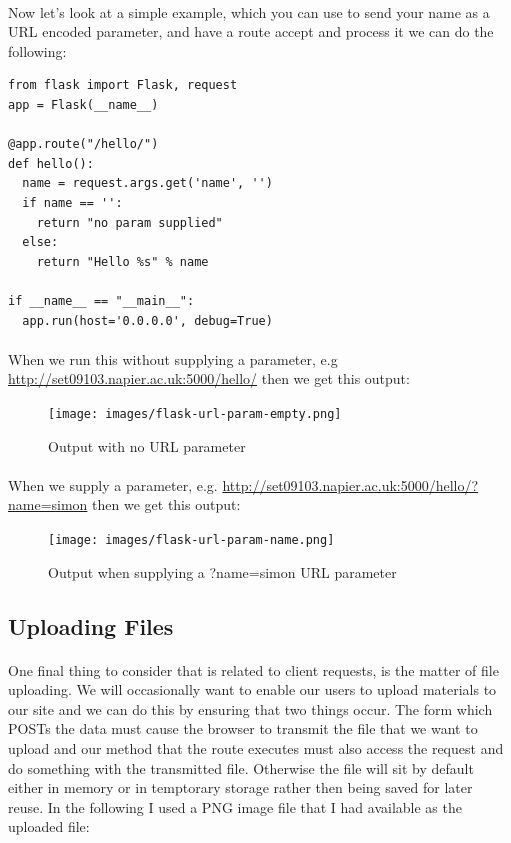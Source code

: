 \documentclass[12pt, a4paper, oneside]{book}
\begin{document}
\paragraph{} Now let's look at a simple example, which you can use to send your name as a URL encoded parameter, and have a route accept and process it we can do the following:

\begin{lstlisting}
from flask import Flask, request
app = Flask(__name__)

@app.route("/hello/")
def hello():
  name = request.args.get('name', '')
  if name == '':
    return "no param supplied"
  else:
    return "Hello %s" % name

if __name__ == "__main__":
  app.run(host='0.0.0.0', debug=True)
\end{lstlisting}

\paragraph{} When we run this without supplying a parameter, e.g \url{http://set09103.napier.ac.uk:5000/hello/} then we get this output:

\begin{figure}[H]
\centering
\texttt{[image: images/flask-url-param-empty.png]}
\caption{Output with no URL parameter}
\label{fig:flask-url-param-empty}
\end{figure}

\paragraph{} When we supply a parameter, e.g. \url{http://set09103.napier.ac.uk:5000/hello/?name=simon} then we get this output:

\begin{figure}[H]
\centering
\texttt{[image: images/flask-url-param-name.png]}
\caption{Output when supplying a ?name=simon URL parameter}
\label{fig:flask-url-param-name}
\end{figure}


\subsection{Uploading Files}
\label{file-uploading}
\paragraph{} One final thing to consider that is related to client requests, is the matter of file uploading. We will occasionally want to enable our users to upload materials to our site and we can do this by ensuring that two things occur. The form which POSTs the data must cause the browser to transmit the file that we want to upload and our method that the route executes must also access the request and do something with the transmitted file. Otherwise the file will sit by default either in memory or in temptorary storage rather then being saved for later reuse. In the following I used a PNG image file that I had available as the uploaded file:
\end{document}
